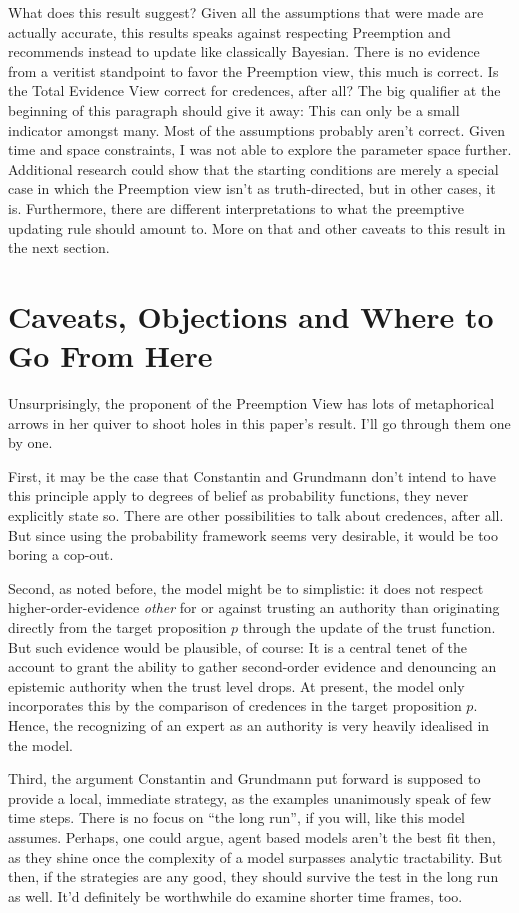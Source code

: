 \documentclass[11pt, a4paper]{scrartcl}
\renewcommand{\i}[1]{\emph{#1}}
\begin{document}
What does this result suggest? Given all the assumptions that were made are actually accurate, this results speaks against respecting Preemption and recommends instead to update like classically Bayesian. There is no evidence from a veritist standpoint to favor the Preemption view, this much is correct. Is the Total Evidence View correct for credences, after all? The big qualifier at the beginning of this paragraph should give it away: This can only be a small indicator amongst many. Most of the assumptions probably aren't correct. Given time and space constraints, I was not able to explore the parameter space further. Additional research could show that the starting conditions are merely a special case in which the Preemption view isn't as truth-directed, but in other cases, it is. Furthermore, there are different interpretations to what the preemptive updating rule should amount to. More on that and other caveats to this result in the next section.
\newpage
\section{Caveats, Objections and Where to Go From Here}

Unsurprisingly, the proponent of the Preemption View has lots of metaphorical arrows in her quiver to shoot holes in this paper's result. I'll go through them one by one.

First, it may be the case that Constantin and Grundmann don't intend to have this principle apply to degrees of belief as probability functions, they never explicitly state so. There are other possibilities to talk about credences, after all. But since using the probability framework seems very desirable, it would be too boring a cop-out.

Second, as noted before, the model might be to simplistic: it does not respect higher-order-evidence \i{other} for or against trusting an authority than originating directly from the target proposition $p$ through the update of the trust function. But such evidence would be plausible, of course: It is a central tenet of the account to grant the ability to gather second-order evidence and denouncing an epistemic authority when the trust level drops. At present, the model only incorporates this by the comparison of credences in the target proposition $p$. Hence, the recognizing of an expert as an authority is very heavily idealised in the model.

Third, the argument Constantin and Grundmann put forward is supposed to provide a local, immediate strategy, as the examples unanimously speak of few time steps. There is no focus on ``the long run'', if you will, like this model assumes. Perhaps, one could argue, agent based models aren't the best fit then, as they shine once the complexity of a model surpasses analytic tractability. But then, if the strategies are any good, they should survive the test in the long run as well. It'd definitely be worthwhile do examine shorter time frames, too.   
\end{document}
